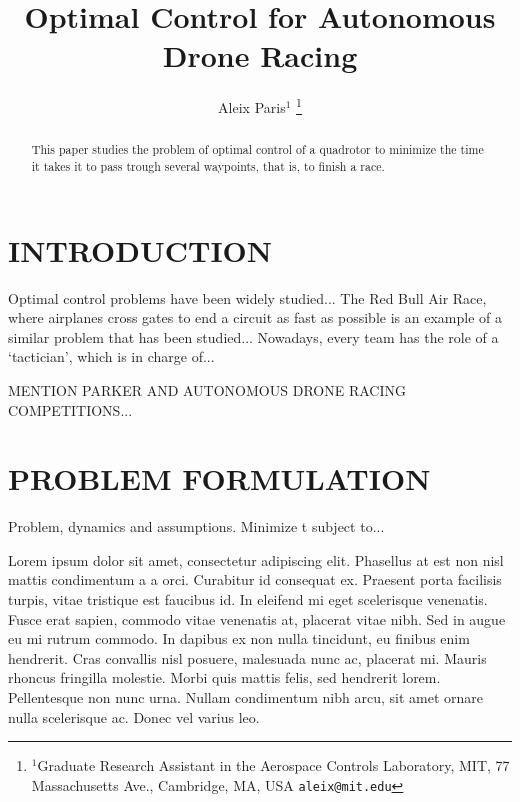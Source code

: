 \documentclass[letterpaper, 10 pt, conference]{ieeeconf}  %
\title{\LARGE \bf
Optimal Control for Autonomous Drone Racing
}
\author{Aleix Paris$^{1}$%
\thanks{$^{1}$Graduate Research Assistant in the Aerospace Controls Laboratory,
        MIT, 77 Massachusetts Ave., Cambridge, MA, USA
        {\tt\small aleix@mit.edu}}%
}
\begin{document}
\maketitle
\thispagestyle{empty}
\pagestyle{empty}

\begin{abstract}

This paper studies the problem of optimal control of a quadrotor to minimize the time it takes it to pass trough several waypoints, that is, to finish a race.

\end{abstract}


\section{INTRODUCTION}\label{s:intro}

Optimal control problems have been widely studied...
The Red Bull Air Race, where airplanes cross gates to end a circuit as fast as possible is an example of a similar problem that has been studied... Nowadays, every team has the role of a `tactician', which is in charge of...

MENTION PARKER AND AUTONOMOUS DRONE RACING COMPETITIONS...


\section{PROBLEM FORMULATION}\label{s:problem}

Problem, dynamics and assumptions. Minimize t subject to...


 Lorem ipsum dolor sit amet, consectetur adipiscing elit. Phasellus at est non nisl mattis condimentum a a orci. Curabitur id consequat ex. Praesent porta facilisis turpis, vitae tristique est faucibus id. In eleifend mi eget scelerisque venenatis. Fusce erat sapien, commodo vitae venenatis at, placerat vitae nibh. Sed in augue eu mi rutrum commodo. In dapibus ex non nulla tincidunt, eu finibus enim hendrerit. Cras convallis nisl posuere, malesuada nunc ac, placerat mi. Mauris rhoncus fringilla molestie. Morbi quis mattis felis, sed hendrerit lorem. Pellentesque non nunc urna. Nullam condimentum nibh arcu, sit amet ornare nulla scelerisque ac. Donec vel varius leo.
 
\end{document}

